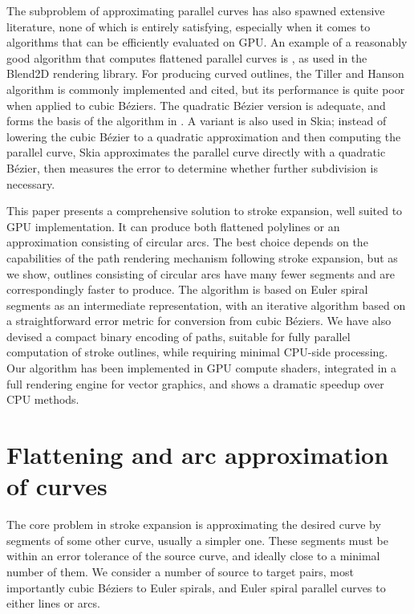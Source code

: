 \documentclass[sigconf, authordraft]{acmart}
\begin{document}
The subproblem of approximating parallel curves has also spawned extensive literature, none of which is entirely satisfying, especially when it comes to algorithms that can be efficiently evaluated on GPU. An example of a reasonably good algorithm that computes flattened parallel curves is \cite{Yzerman2020}, as used in the Blend2D rendering library. For producing curved outlines, the Tiller and Hanson algorithm\cite{Tiller1984} is commonly implemented and cited, but its performance is quite poor when applied to cubic Béziers. The quadratic Bézier version is adequate, and forms the basis of the algorithm in \cite{Nehab2020}. A variant is also used in Skia\cite{Skia}; instead of lowering the cubic Bézier to a quadratic approximation and then computing the parallel curve, Skia approximates the parallel curve directly with a quadratic Bézier, then measures the error to determine whether further subdivision is necessary.

This paper presents a comprehensive solution to stroke expansion, well suited to GPU implementation. It can produce both flattened polylines or an approximation consisting of circular arcs. The best choice depends on the capabilities of the path rendering mechanism following stroke expansion, but as we show, outlines consisting of circular arcs have many fewer segments and are correspondingly faster to produce. The algorithm is based on Euler spiral segments as an intermediate representation, with an iterative algorithm based on a straightforward error metric for conversion from cubic Béziers. We have also devised a compact binary encoding of paths, suitable for fully parallel computation of stroke outlines, while requiring minimal CPU-side processing. Our algorithm has been implemented in GPU compute shaders, integrated in a full rendering engine for vector graphics, and shows a dramatic speedup over CPU methods.

\section{Flattening and arc approximation of curves}


The core problem in stroke expansion is approximating the desired curve by segments of some other curve, usually a simpler one. These segments must be within an error tolerance of the source curve, and ideally close to a minimal number of them. We consider a number of source to target pairs, most importantly cubic Béziers to Euler spirals, and Euler spiral parallel curves to either lines or arcs.
\end{document}
